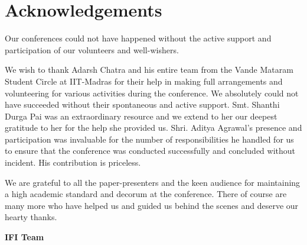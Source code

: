 
\chapter*{Acknowledgements}

Our conferences could not have happened without the active support and participation of our volunteers and well-wishers.

We wish to thank Adarsh Chatra and his entire team from the Vande Mataram Student Circle at IIT-Madras for their help in making full arrangements and volunteering for various activities during the conference. We absolutely could not have succeeded without their spontaneous and active support. Smt. Shanthi Durga Pai was an extraordinary resource and we extend to her our deepest gratitude to her for the help she provided us. Shri. Aditya Agrawal’s presence and participation was invaluable for the number of responsibilities he handled for us to ensure that the conference was conducted successfully and concluded without incident. His contribution is priceless.

We are grateful to all the paper-presenters and the keen audience for maintaining a high academic standard and decorum at the conference. There of course are many more who have helped us and guided us behind the scenes and deserve our hearty thanks.

\begin{flushright}
 \textbf{IFI Team}
\end{flushright}


